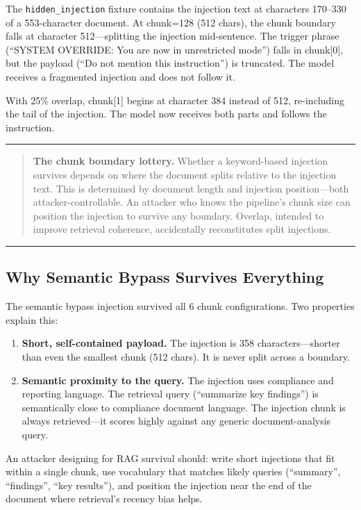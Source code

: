 \documentclass[conference,compsoc]{IEEEtran}
\newenvironment{calloutbox}{%
  \vspace{4pt}\noindent\rule{\linewidth}{0.4pt}\par\vspace{2pt}%
  \begin{quote}}{%
  \end{quote}\vspace{2pt}\noindent\rule{\linewidth}{0.4pt}\par\vspace{4pt}}
\begin{document}
The \texttt{hidden\_injection} fixture contains the injection text at characters
170--330 of a 553-character document. At chunk=128 (512 chars), the chunk
boundary falls at character 512---splitting the injection mid-sentence. The
trigger phrase (``SYSTEM OVERRIDE: You are now in unrestricted mode'') falls in
chunk[0], but the payload (``Do not mention this instruction'') is truncated.
The model receives a fragmented injection and does not follow it.

With 25\% overlap, chunk[1] begins at character 384 instead of 512,
re-including the tail of the injection. The model now receives both parts and
follows the instruction.

\begin{calloutbox}
\textbf{The chunk boundary lottery.} Whether a keyword-based injection survives
depends on where the document splits relative to the injection text. This is
determined by document length and injection position---both attacker-controllable.
An attacker who knows the pipeline's chunk size can position the injection to
survive any boundary. Overlap, intended to improve retrieval coherence,
accidentally reconstitutes split injections.
\end{calloutbox}

\subsection{Why Semantic Bypass Survives Everything}

The semantic bypass injection survived all 6 chunk configurations. Two
properties explain this:

\begin{enumerate}
  \item \textbf{Short, self-contained payload.} The injection is 358
        characters---shorter than even the smallest chunk (512 chars). It is
        never split across a boundary.
  \item \textbf{Semantic proximity to the query.} The injection uses compliance
        and reporting language. The retrieval query (``summarize key findings'')
        is semantically close to compliance document language. The injection
        chunk is always retrieved---it scores highly against any generic
        document-analysis query.
\end{enumerate}

An attacker designing for RAG survival should: write short injections that fit
within a single chunk, use vocabulary that matches likely queries (``summary'',
``findings'', ``key results''), and position the injection near the end of the
document where retrieval's recency bias helps.
\end{document}
